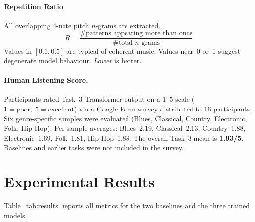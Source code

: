 \documentclass[letterpaper]{article}
\begin{document}
\paragraph{Repetition Ratio.}
All overlapping 4-note pitch $n$-grams are extracted.
\begin{equation}
  R = \frac{\#\text{patterns appearing more than once}}
           {\#\text{total } n\text{-grams}}
\end{equation}
Values in $[0.1, 0.5]$ are typical of coherent music.
Values near~0 or~1 suggest degenerate model behaviour.
\emph{Lower} is better.

\paragraph{Human Listening Score.}
Participants rated Task~3 Transformer output on a 1--5 scale
($1 = \text{poor},\;5 = \text{excellent}$) via a Google Form survey
distributed to 16 participants.  Six genre-specific samples were evaluated
(Blues, Classical, Country, Electronic, Folk, Hip-Hop).
Per-sample averages: Blues~2.19, Classical~2.13, Country~1.88,
Electronic~1.69, Folk~1.81, Hip-Hop~1.88.
The overall Task~3 mean is \textbf{1.93/5}.
Baselines and earlier tasks were not included in the survey.

\section{Experimental Results}
\label{sec:results}

Table~\ref{tab:results} reports all metrics for the two baselines and the
three trained models.
\end{document}
